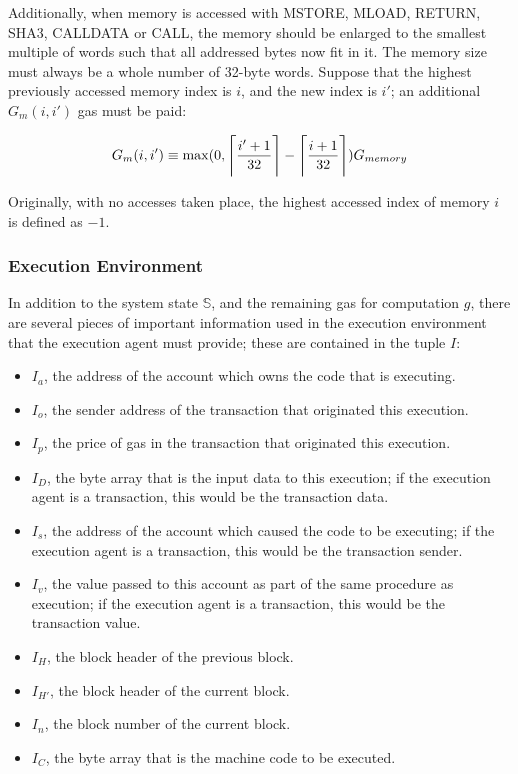 \documentclass[9pt,oneside]{amsart}
\DeclarePairedDelimiter{\ceil}{\lceil}{\rceil}
\begin{document}
\begin{multicols}{2}
Additionally, when memory is accessed with {\small MSTORE}, {\small MLOAD}, {\small RETURN}, {\small SHA3}, {\small CALLDATA} or {\small CALL}, the memory should be enlarged to the smallest multiple of words such that all addressed bytes now fit in it. The memory size must always be a whole number of 32-byte words. Suppose that the highest previously accessed memory index is $i$, and the new index is $i'$; an additional $G_{m}(i, i')$ gas must be paid:

\begin{equation}
G_{m}(i, i') \equiv \max(0, \ceil[\Bigg]{\frac{i'+1}{32}} - \ceil[\Bigg]{\frac{i+1}{32}}) G_{memory}
\end{equation}

Originally, with no accesses taken place, the highest accessed index of memory $i$ is defined as $-1$.


\subsubsection{Execution Environment}

In addition to the system state $\mathbb{S}$, and the remaining gas for computation $g$, there are several pieces of important information used in the execution environment that the execution agent must provide; these are contained in the tuple $I$:

\begin{itemize}
\item $I_a$, the address of the account which owns the code that is executing.
\item $I_o$, the sender address of the transaction that originated this execution.
\item $I_p$, the price of gas in the transaction that originated this execution.
\item $I_D$, the byte array that is the input data to this execution; if the execution agent is a transaction, this would be the transaction data.
\item $I_s$, the address of the account which caused the code to be executing; if the execution agent is a transaction, this would be the transaction sender.
\item $I_v$, the value passed to this account as part of the same procedure as execution; if the execution agent is a transaction, this would be the transaction value.
\item $I_H$, the block header of the previous block.
\item $I_{H'}$, the block header of the current block.
\item $I_n$, the block number of the current block.
\item $I_C$, the byte array that is the machine code to be executed.
\end{itemize}


\end{multicols}
\end{document}
